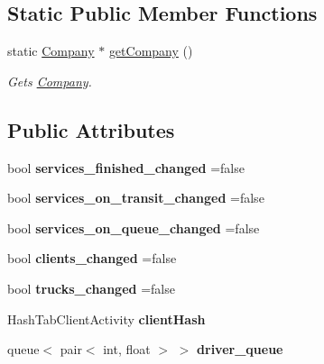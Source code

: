 \subsection*{Static Public Member Functions}
\begin{DoxyCompactItemize}
\item 
static \hyperlink{class_company}{Company} $\ast$ \hyperlink{class_company_a453411f6ef4bab2e878867302fdcf484}{get\+Company} ()
\begin{DoxyCompactList}\small\item\em Gets \hyperlink{class_company}{Company}. \end{DoxyCompactList}\end{DoxyCompactItemize}
\subsection*{Public Attributes}
\begin{DoxyCompactItemize}
\item 
\mbox{\label{class_company_a0671d8c8afcbe73e5719eac7db205859}} 
bool {\bfseries services\+\_\+finished\+\_\+changed} =false
\item 
\mbox{\label{class_company_aeac99d209136e732106bc0a3dad7d5d1}} 
bool {\bfseries services\+\_\+on\+\_\+transit\+\_\+changed} =false
\item 
\mbox{\label{class_company_a7f986eaf19517385d257ecf74a1a970a}} 
bool {\bfseries services\+\_\+on\+\_\+queue\+\_\+changed} =false
\item 
\mbox{\label{class_company_ab565013c5770e9ac94cc7f2875917f45}} 
bool {\bfseries clients\+\_\+changed} =false
\item 
\mbox{\label{class_company_ae9ee930a4a92e6f048960e486d2783dd}} 
bool {\bfseries trucks\+\_\+changed} =false
\item 
\mbox{\label{class_company_a524c1592edf0f6e6b249ff5887d6324e}} 
Hash\+Tab\+Client\+Activity {\bfseries client\+Hash}
\item 
\mbox{\label{class_company_a88f095e316f530c1f1650159cab94f79}} 
queue$<$ pair$<$ int, float $>$ $>$ {\bfseries driver\+\_\+queue}
\end{DoxyCompactItemize}


